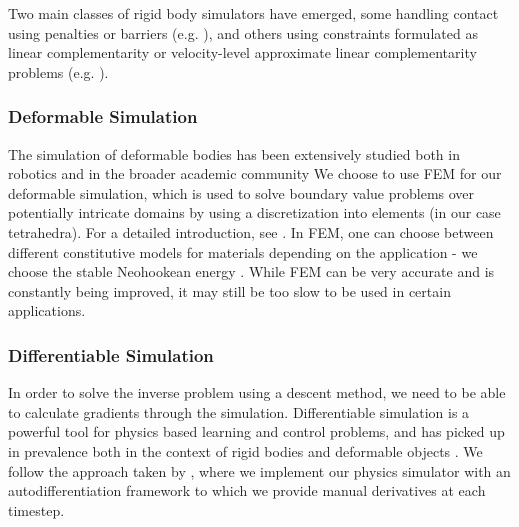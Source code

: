  Two main classes of rigid body simulators have emerged, some handling contact using penalties or barriers (e.g. \cite{RigidIPC, drumwright-rbd}), and others using constraints  formulated as linear complementarity or velocity-level approximate linear complementarity problems (e.g. \cite{erleben2007velocity, trinkle-rbd}).

\subsubsection{Deformable Simulation}
The simulation of deformable bodies has been extensively studied both in robotics and in the broader academic community 
We choose to use FEM for our deformable simulation, which is used to solve boundary value problems over potentially intricate domains by using a discretization into elements (in our case tetrahedra). For a detailed introduction, see \cite{fem-book, dynamic-deformables, sifakis2012fem}. In FEM, one can choose between different constitutive models for materials depending on the application - we choose the stable Neohookean energy \cite{dynamic-deformables, smith-kim-nh}. While FEM can be very accurate and is constantly being improved, it may still be too slow to be used in certain applications.

\subsubsection{Differentiable Simulation}
In order to solve the inverse problem using a descent method, we need to be able to calculate gradients through the simulation. Differentiable simulation is a powerful tool for physics based learning and control problems, and has picked up in prevalence both in the context of rigid bodies \cite{neuralsim, JADE, BelbutePeres2018EndtoEndDP, diffsdfsim} and deformable objects \cite{gradsim, du2021diffpd, qiao2021differentiable, gjoka2022differentiable, add-diff-phys, diffcloth}. We follow the approach taken by \citet{gradsim}, where we implement our physics simulator with an autodifferentiation framework to which we provide manual derivatives at each timestep.
